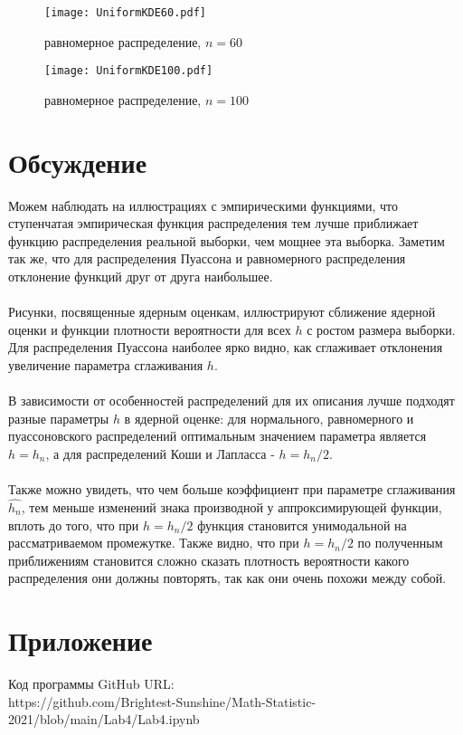 \documentclass{article}
\begin{document}
\begin{figure}[H]
	{\texttt{[image: UniformKDE60.pdf]}}
		\caption{равномерное распределение, $n=60$} 
		\label{fig:normal}
	\end{figure}

\begin{figure}[H]
	{\texttt{[image: UniformKDE100.pdf]}}
		\caption{равномерное распределение, $n=100$} 
		\label{fig:normal}
	\end{figure}
	
\section{Обсуждение}
\noindent Можем наблюдать на иллюстрациях с эмпирическими функциями, что ступенчатая эмпирическая функция распределения тем лучше приближает функцию распределения реальной выборки, чем мощнее эта выборка. Заметим так же, что для распределения Пуассона и равномерного распределения отклонение функций друг от друга наибольшее.\\\\
\noindent Рисунки, посвященные ядерным оценкам, иллюстрируют сближение ядерной оценки и функции плотности вероятности для всех $h$ с ростом размера выборки. Для распределения Пуассона наиболее ярко видно, как сглаживает отклонения увеличение параметра сглаживания $h$.\\\\
\noindent В зависимости от особенностей распределений для их описания лучше подходят разные параметры $h$ в ядерной оценке: для нормального, равномерного и пуассоновского распределений оптимальным значением параметра является $h=h_n$, а для распределений Коши и Лапласса - $h=h_n/2$.\\\\
\noindent Также можно увидеть, что чем больше коэффициент при параметре сглаживания $\hat{h_n}$, тем меньше изменений знака производной у аппроксимирующей функции, вплоть до того, что при $h=h_n/2$ функция становится унимодальной на рассматриваемом промежутке. Также видно, что при $h=h_n/2$ по полученным приближениям становится сложно сказать плотность вероятности какого распределения они должны повторять, так как они очень похожи между собой.

\section{Приложение}

\noindent Код программы GitHub URL:\\
\newline https://github.com/Brightest-Sunshine/Math-Statistic-2021/blob/main/Lab4/Lab4.ipynb
\end{document}

